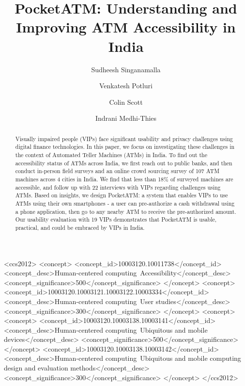 \documentclass[sigconf]{acmart}
\begin{document}
\title{PocketATM: Understanding and Improving ATM Accessibility in India}

\author{Sudheesh Singanamalla}

\author{Venkatesh Potluri}

\author{Colin Scott}

\author{Indrani Medhi-Thies}

\renewcommand{\shortauthors}{S. Singanamalla et al.}


\begin{abstract}
Visually impaired people (VIPs) face significant usability and privacy challenges using digital finance technologies. In this paper, we focus on investigating these challenges in the context of Automated Teller Machines (ATMs) in India. To find out the accessibility status of ATMs across India, we first reach out to public banks, and then conduct in-person field surveys and an online crowd sourcing survey of 107 ATM machines across 4 cities in India. We find that less than 18\% of surveyed machines are accessible, and follow up with 22 interviews with VIPs regarding challenges using ATMs. Based on insights, we design PocketATM: a system that enables VIPs to use ATMs using their own smartphones - a user can pre-authorize a cash withdrawal using a phone application, then go to any nearby ATM to receive the pre-authorized amount. Our usability evaluation with 19 VIPs demonstrates that PocketATM is usable, practical, and could be embraced by VIPs in India.
\end{abstract}

%
%
\begin{CCSXML}
<ccs2012>
<concept>
<concept_id>10003120.10011738</concept_id>
<concept_desc>Human-centered computing~Accessibility</concept_desc>
<concept_significance>500</concept_significance>
</concept>
<concept>
<concept_id>10003120.10003121.10003122.10003334</concept_id>
<concept_desc>Human-centered computing~User studies</concept_desc>
<concept_significance>300</concept_significance>
</concept>
<concept>
<concept>
<concept_id>10003120.10003138.10003141</concept_id>
<concept_desc>Human-centered computing~Ubiquitous and mobile devices</concept_desc>
<concept_significance>500</concept_significance>
</concept>
<concept_id>10003120.10003138.10003142</concept_id>
<concept_desc>Human-centered computing~Ubiquitous and mobile computing design and evaluation methods</concept_desc>
<concept_significance>300</concept_significance>
</concept>
</ccs2012>
\end{CCSXML}
\end{document}

